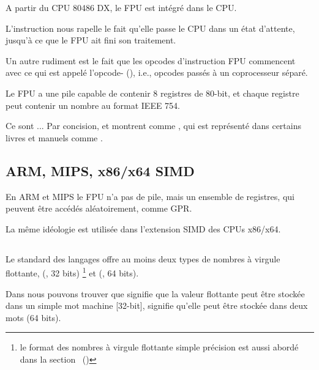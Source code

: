 A partir du CPU 80486 DX, le \ac{FPU} est intégré dans le \ac{CPU}.

L'instruction  nous rapelle le fait qu'elle passe le \ac{CPU} dans un
état d'attente, jusqu'à ce que le \ac{FPU} ait fini son traitement.

Un autre rudiment est le fait que les opcodes d'instruction \ac{FPU} commencent
avec ce qui est appelé l'opcode- (), i.e., opcodes
passés à un coprocesseur séparé.

\label{FPU_is_stack}

Le FPU a une pile capable de contenir 8 registres de 80-bit, et chaque registre peut
contenir un nombre au format IEEE 754\FNURLIEEE.

Ce sont ... Par concision, \IDA et \olly montrent  comme ,
qui est représenté dans certains livres et manuels comme .

\subsection{ARM, MIPS, x86/x64 SIMD}

En ARM et MIPS le FPU n'a pas de pile, mais un ensemble de registres, qui peuvent
être accédés aléatoirement, comme \ac{GPR}.

La même idéologie est utilisée dans l'extension SIMD des CPUs x86/x64.

\subsection{\CCpp}


Le standard des langages \CCpp offre au moins deux types de nombres à virgule flottante,
\Tfloat (\FNURLSP, 32 bits) \footnote{le format des nombres
à virgule flottante simple précision est aussi abordé dans la section \IT{\WorkingWithFloatAsWithStructSubSubSectionName}~()}
et \Tdouble  (\FNURLDP, 64 bits).

Dans  nous pouvons trouver que 
signifie que la valeur flottante peut être stockée dans un simple mot machine [32-bit],
 signifie qu'elle peut être stockée dans deux mots (64 bits).


